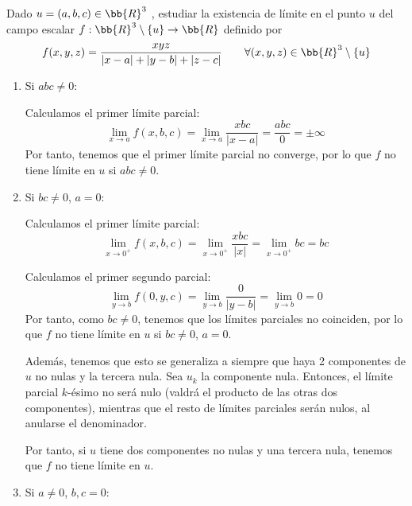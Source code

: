 \begin{ejercicio}
    Dado $u = (a, b, c) \in \bb{R}^3$ , estudiar la existencia de límite en el punto $u$ del campo escalar $f : \bb{R}^3\setminus \{u\}\to \bb{R}$ definido por
    \begin{equation*}
        f(x,y,z)=\frac{xyz}{|x-a|+|y-b|+|z-c|} \qquad \forall (x,y,z)\in \bb{R}^3\setminus\{u\}
    \end{equation*}

    \begin{enumerate}
        \item Si $abc\neq 0$:

        Calculamos el primer límite parcial:
        \begin{equation*}
            \lim_{x\to a}f(x,b,c)=
            \lim_{x\to a}\frac{xbc}{|x-a|} = \frac{abc}{0}=\pm \infty
        \end{equation*}
        Por tanto, tenemos que el primer límite parcial no converge, por lo que $f$ no tiene límite en $u$ si $abc\neq 0$.

        \item Si $bc\neq 0$, $a=0$:

        Calculamos el primer límite parcial:
        \begin{equation*}
            \lim_{x\to 0^+}f(x,b,c)=
            \lim_{x\to 0^+}\frac{xbc}{|x|} =
            \lim_{x\to 0^+}bc=bc
        \end{equation*}

        Calculamos el primer segundo parcial:
        \begin{equation*}
            \lim_{y\to b}f(0,y,c)=
            \lim_{y\to b}\frac{0}{|y-b|} =
            \lim_{y\to b}0=0
        \end{equation*}
        Por tanto, como $bc\neq 0$, tenemos que los límites parciales no coinciden, por lo que $f$ no tiene límite en $u$ si $bc\neq 0$, $a=0$.

        Además, tenemos que esto se generaliza a siempre que haya 2 componentes de $u$ no nulas y la tercera nula. Sea $u_k$ la componente nula. Entonces, el límite parcial $k$-ésimo no será nulo (valdrá el producto de las otras dos componentes), mientras que el resto de límites parciales serán nulos, al anularse el denominador.

        Por tanto, si $u$ tiene dos componentes no nulas y una tercera nula, tenemos que $f$ no tiene límite en $u$.

        \item Si $a\neq 0$, $b,c=0$:


\end{enumerate}
\end{ejercicio}
